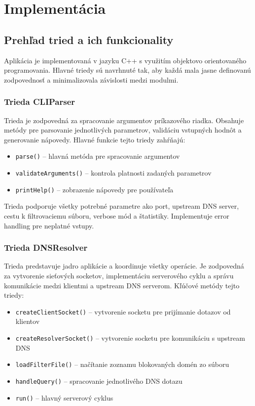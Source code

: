 \documentclass[12pt,a4paper]{article}
\begin{document}
\section{Implementácia}

\subsection{Prehľad tried a ich funkcionality}

Aplikácia je implementovaná v jazyku C++ s využitím objektovo orientovaného programovania. Hlavné triedy sú navrhnuté tak, aby každá mala jasne definovanú zodpovednosť a minimalizovala závislosti medzi modulmi.

\subsubsection{Trieda CLIParser}

Trieda je zodpovedná za spracovanie argumentov príkazového riadka. Obsahuje metódy pre parsovanie jednotlivých parametrov, validáciu vstupných hodnôt a generovanie nápovedy. Hlavné funkcie tejto triedy zahŕňajú:

\begin{itemize}
    \item \texttt{parse()} -- hlavná metóda pre spracovanie argumentov
    \item \texttt{validateArguments()} -- kontrola platnosti zadaných parametrov
    \item \texttt{printHelp()} -- zobrazenie nápovedy pre používateľa
\end{itemize}

Trieda podporuje všetky potrebné parametre ako port, upstream DNS server, cestu k filtrovaciemu súboru, verbose mód a štatistiky. Implementuje error handling pre neplatné vstupy.

\subsubsection{Trieda DNSResolver}

Trieda predstavuje jadro aplikácie a koordinuje všetky operácie. Je zodpovedná za vytvorenie sieťových socketov, implementáciu serverového cyklu a správu komunikácie medzi klientmi a upstream DNS serverom. Kľúčové metódy tejto triedy:

\begin{itemize}
    \item \texttt{createClientSocket()} -- vytvorenie socketu pre prijímanie dotazov od klientov
    \item \texttt{createResolverSocket()} -- vytvorenie socketu pre komunikáciu s upstream DNS
    \item \texttt{loadFilterFile()} -- načítanie zoznamu blokovaných domén zo súboru
    \item \texttt{handleQuery()} -- spracovanie jednotlivého DNS dotazu
    \item \texttt{run()} -- hlavný serverový cyklus
\end{itemize}
\end{document}
